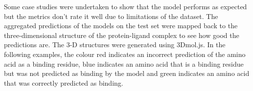 \documentclass[journal=jacsat,manuscript=article]{achemso}
\begin{document}







\quad Some case studies were undertaken to show that the model performs as expected but the metrics don't rate it well due to limitations of the dataset. The aggregated predictions of the models on the test set were mapped back to the three-dimensional structure of the protein-ligand complex to see how good the predictions are. The 3-D structures were generated using 3Dmol.js\cite{rego20153dmol}. In the following examples, the colour red indicates an incorrect prediction of the amino acid as a binding residue, blue indicates an amino acid that is a binding residue but was not predicted as binding by the model and green indicates an amino acid that was correctly predicted as binding.
\end{document}
